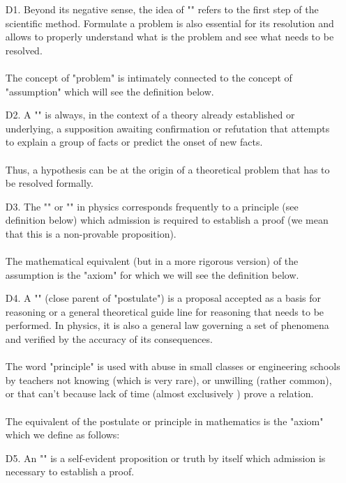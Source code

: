 \begin{itemize}
	\item[D1.] Beyond its negative sense, the idea of "" refers to the first step of the scientific method. Formulate a problem is also essential for its resolution and allows to properly understand what is the problem and see what needs to be resolved. \\\\
	The concept of "problem" is intimately connected to the concept of "assumption" which will see the definition below. 

	\item[D2.] A "" is always, in the context of a theory already established or underlying, a supposition awaiting confirmation or refutation that attempts to explain a group of facts or predict the onset of new facts.\\\\
	Thus, a hypothesis can be at the origin of a theoretical problem that has to be resolved formally. 

	\item[D3.] The "" or  "" in physics corresponds frequently to a principle (see definition below) which admission is required to establish a proof (we mean that this is a non-provable proposition).\\\\
	The mathematical equivalent (but in a more rigorous version) of the assumption is the "axiom" for which we will see the definition below. 

	\item[D4.] A "" (close parent of "postulate") is a proposal accepted as a basis for reasoning or a general theoretical guide line for reasoning that needs to be performed. In physics, it is also a general law governing a set of phenomena and verified by the accuracy of its consequences. \\\\
The word "principle" is used with abuse in small classes or engineering schools by teachers not knowing (which is very rare), or unwilling (rather common), or that can't because lack of time (almost exclusively ) prove a relation.\\\\
The equivalent of the postulate or principle in mathematics is the "axiom" which we define as follows: 

	\item[D5.] An "" is a self-evident proposition or truth by itself which admission is necessary to establish a proof.\label{axiom} 
\end{itemize}

